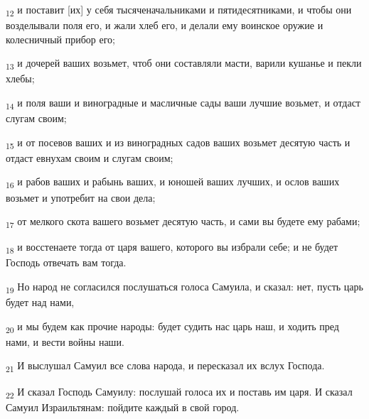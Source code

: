 \begin{tcolorbox}
\textsubscript{12} и поставит [их] у себя тысяченачальниками и пятидесятниками, и чтобы они возделывали поля его, и жали хлеб его, и делали ему воинское оружие и колесничный прибор его;
\end{tcolorbox}
\begin{tcolorbox}
\textsubscript{13} и дочерей ваших возьмет, чтоб они составляли масти, варили кушанье и пекли хлебы;
\end{tcolorbox}
\begin{tcolorbox}
\textsubscript{14} и поля ваши и виноградные и масличные сады ваши лучшие возьмет, и отдаст слугам своим;
\end{tcolorbox}
\begin{tcolorbox}
\textsubscript{15} и от посевов ваших и из виноградных садов ваших возьмет десятую часть и отдаст евнухам своим и слугам своим;
\end{tcolorbox}
\begin{tcolorbox}
\textsubscript{16} и рабов ваших и рабынь ваших, и юношей ваших лучших, и ослов ваших возьмет и употребит на свои дела;
\end{tcolorbox}
\begin{tcolorbox}
\textsubscript{17} от мелкого скота вашего возьмет десятую часть, и сами вы будете ему рабами;
\end{tcolorbox}
\begin{tcolorbox}
\textsubscript{18} и восстенаете тогда от царя вашего, которого вы избрали себе; и не будет Господь отвечать вам тогда.
\end{tcolorbox}
\begin{tcolorbox}
\textsubscript{19} Но народ не согласился послушаться голоса Самуила, и сказал: нет, пусть царь будет над нами,
\end{tcolorbox}
\begin{tcolorbox}
\textsubscript{20} и мы будем как прочие народы: будет судить нас царь наш, и ходить пред нами, и вести войны наши.
\end{tcolorbox}
\begin{tcolorbox}
\textsubscript{21} И выслушал Самуил все слова народа, и пересказал их вслух Господа.
\end{tcolorbox}
\begin{tcolorbox}
\textsubscript{22} И сказал Господь Самуилу: послушай голоса их и поставь им царя. И сказал Самуил Израильтянам: пойдите каждый в свой город.
\end{tcolorbox}
